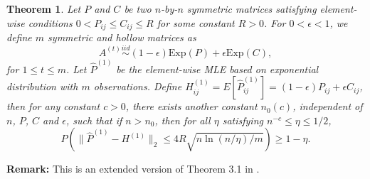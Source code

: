 \documentclass[a4paper]{article}
\newtheorem{theorem}[fact]{Theorem}
\renewcommand{\hat}{\widehat}
\begin{document}
\begin{theorem}%
\label{thm:P1Diff}
Let $P$ and $C$ be two $n$-by-$n$ symmetric matrices satisfying element-wise conditions $0 < P_{ij} \le C_{ij} \le R$ for some constant $R > 0$. For $0 < \epsilon < 1$, we define $m$ symmetric and hollow matrices as
\[
	A^{(t)} \stackrel{iid}{\sim} (1-\epsilon) \mathrm{Exp}(P) + \epsilon \mathrm{Exp}(C),
\]
for $1 \le t \le m$.
Let $\hat{P}^{(1)}$ be the element-wise MLE based on exponential distribution with $m$ observations.
Define $H_{ij}^{(1)} = E[\hat{P}_{ij}^{(1)}] = (1-\epsilon) P_{ij} + \epsilon C_{ij}$,
then for any constant $c > 0$, there exists another constant $n_0(c)$, independent of $n$, $P$, $C$ and $\epsilon$, such that if $n > n_0$, then for all $\eta$ satisfying $n^{-c} \le \eta \le 1/2$,
\[
	P \left( \| \hat{P}^{(1)} - H^{(1)} \|_2 \le 4 R \sqrt{n \ln(n/\eta)/m}\right) \ge 1 - \eta.
\]
\end{theorem}
\textbf{Remark:} This is an extended version of Theorem 3.1 in \citep{oliveira2009concentration}. \\
\end{document}
